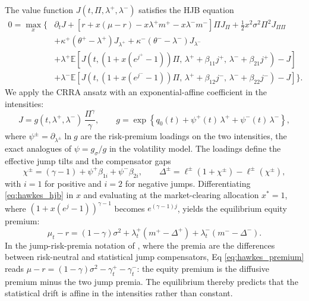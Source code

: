 \documentclass[11pt]{article}
\theoremstyle{remark}
\newcommand{\E}{\mathbb{E}}
\begin{document}
The value function $J(t,\Pi,\lambda^{+},\lambda^{-})$ satisfies the HJB equation
\begin{equation}\label{eq:hawkes_hjb}
\begin{split}
0 = \max_{x} \Big\{ &\partial_{t}J + \left[ r + x(\mu-r) - x\lambda^{+}m^{+} - x\lambda^{-}m^{-} \right]\Pi J_{\Pi} + \frac{1}{2}x^{2}\sigma^{2}\Pi^{2}J_{\Pi\Pi} \\
&+ \kappa^{+}(\theta^{+}-\lambda^{+})J_{\lambda^{+}} + \kappa^{-}(\theta^{-}-\lambda^{-})J_{\lambda^{-}} \\
&+ \lambda^{+} \E\left[ J\!\left(t, \left(1+x(e^{j^{+}}-1)\right)\Pi,\, \lambda^{+}+\beta_{11}j^{+},\, \lambda^{-}+\beta_{21}j^{+}\right) - J \right] \\
&+ \lambda^{-} \E\left[ J\!\left(t, \left(1+x(e^{j^{-}}-1)\right)\Pi,\, \lambda^{+}+\beta_{12}j^{-},\, \lambda^{-}+\beta_{22}j^{-}\right) - J \right] \Big\}.
\end{split}
\end{equation}
We apply the CRRA ansatz with an exponential-affine coefficient in the intensities:
\begin{equation}\label{eq:hawkes_ansatz}
J = g(t,\lambda^{+},\lambda^{-})\, \frac{\Pi^{\gamma}}{\gamma}, \qquad
g = \exp\left\{ q_{0}(t) + \psi^{+}(t)\,\lambda^{+} + \psi^{-}(t)\,\lambda^{-} \right\},
\end{equation}
where $\psi^{\pm} = \partial_{\lambda^{\pm}} \ln g$ are the risk-premium loadings on the two intensities, the exact analogues of $\psi = g_{\sigma}/g$ in the volatility model. The loadings define the effective jump tilts and the compensator gaps
\begin{equation}\label{eq:hawkes_chi}
\chi^{\pm} = (\gamma-1) + \psi^{+}\beta_{1i} + \psi^{-}\beta_{2i}, \qquad
\Delta^{\pm} = \ell^{\pm}(1+\chi^{\pm}) - \ell^{\pm}(\chi^{\pm}),
\end{equation}
with $i=1$ for positive and $i=2$ for negative jumps. Differentiating \eqref{eq:hawkes_hjb} in $x$ and evaluating at the market-clearing allocation $x^{*}=1$, where $\left(1+x(e^{j}-1)\right)^{\gamma-1}$ becomes $e^{(\gamma-1)j}$, yields the equilibrium equity premium:
\begin{equation}\label{eq:hawkes_premium}
\mu_{t} - r = (1-\gamma)\sigma^{2} + \lambda^{+}_{t}\left( m^{+} - \Delta^{+} \right) + \lambda^{-}_{t}\left( m^{-} - \Delta^{-} \right).
\end{equation}
In the jump-risk-premia notation of \cite{LiuPackhamSepp2026}, where the premia are the differences between risk-neutral and statistical jump compensators, Eq \eqref{eq:hawkes_premium} reads $\mu-r = (1-\gamma)\sigma^{2} - \gamma^{+}_{t} - \gamma^{-}_{t}$: the equity premium is the diffusive premium minus the two jump premia. The equilibrium thereby predicts that the statistical drift is affine in the intensities rather than constant.
\end{document}

